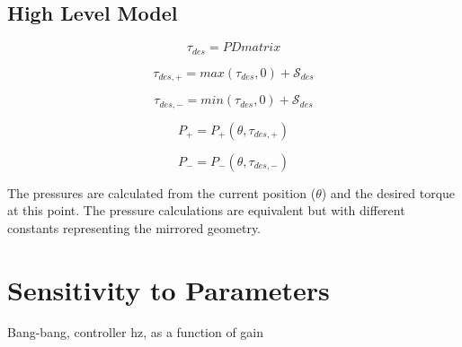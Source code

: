 \documentclass[12pt, letterpaper, oneside, notitlepage, onecolumn]{article}
\newcommand{\bbs}[1]{\section{#1}}
\newcommand{\bbss}[1]{\subsection{#1}}
\begin{document}
\bbss{High Level Model}

\begin{equation}
\tau_{des} = PD matrix
\end{equation}

\begin{equation}
\tau_{des, +} = max(\tau_{des}, 0) + \mathcal{S}_{des}
\end{equation}

\begin{equation}
\tau_{des, -} = min(\tau_{des}, 0) + \mathcal{S}_{des}
\end{equation}

\begin{equation}
P_{+} = P_{+}(\theta, \tau_{des, +})
\end{equation}

\begin{equation}
P_{-} = P_{-}(\theta, \tau_{des, -})
\end{equation}

The pressures are calculated from the current position ($\theta$) and the
desired torque at this point. The pressure calculations are equivalent but with
different constants representing the mirrored geometry.

\bbs{Sensitivity to Parameters}

Bang-bang, controller hz, as a function of gain
\end{document}
